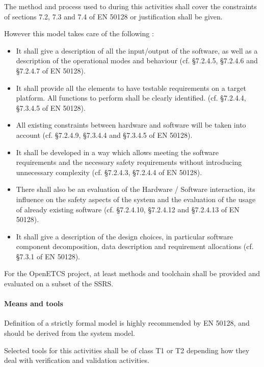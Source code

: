 The method and process used to during this activities shall cover the constraints of sections 7.2, 7.3 and 7.4 of EN 50128 or justification shall be given.


However this model takes care of the following :

\begin{itemize}
\item It shall give a description of all the input/output of the software, as well as a description of the operational modes and behaviour (cf. §7.2.4.5,  §7.2.4.6 and  §7.2.4.7 of EN 50128). 
\item It shall provide all the elements to have testable requirements on a target platform. All functions to perform shall be clearly identified. (cf. §7.2.4.4, §7.3.4.5  of EN 50128).
\item All existing constraints between hardware and software will be taken into account (cf. §7.2.4.9, §7.3.4.4 and §7.3.4.5 of EN 50128).
\item It shall be developed in a way which allows meeting the software
requirements and the necessary safety requirements without introducing
unnecessary complexity (cf. §7.2.4.3,  §7.2.4.4  of EN 50128).
\item There shall also be an evaluation of the
Hardware / Software interaction, its influence on the safety aspects of the system and the
evaluation of the usage of already existing software  (cf. §7.2.4.10,  §7.2.4.12 and §7.2.4.13  of EN 50128).
\item It shall give a  description of the design choices, in particular software component decomposition, data description and requirement allocations (cf. §7.3.1 of EN 50128).
\end{itemize}

For the OpenETCS project, at least methods and toolchain shall be provided and evaluated on a subset of the SSRS.

\paragraph{Means and tools}
\label{sec:sw-means}

Definition of a strictly formal  model is highly recommended by EN 50128, and should be derived from  the system  model.


Selected tools for this activities shall  be of class T1 or T2  depending how they deal  with verification and validation activities.


